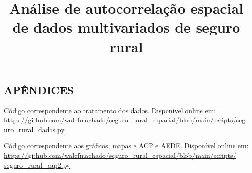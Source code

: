 \documentclass[10pt]{article}
\title{Análise de autocorrelação espacial de dados multivariados de seguro rural}
\date{}
\begin{document}
\maketitle

\begin{abstract}

\end{abstract}



    
%

\begin{singlespace}
\begin{flushleft}
\renewcommand\refname{}
\vspace*{-1.5cm}

\end{flushleft}
\end{singlespace}

\newpage
{}
\begin{center}
\section*{APÊNDICES} 
\end{center}

\begin{singlespace}
\end{singlespace} 
\vspace{0.25cm}
\begin{small}
\linespread{0.86}
\noindent Código correspondente ao tratamento dos dados. Disponível online em: \url{https://github.com/walefmachado/seguro_rural_espacial/blob/main/scripts/seguro_rural_dados.py}

\vspace{0.25cm}

\noindent Código correspondente aos gráficos, mapas e ACP e AEDE. Disponível online em: \url{https://github.com/walefmachado/seguro_rural_espacial/blob/main/scripts/ seguro_rural_cap2.py}
% 
\end{small}
\end{document}
